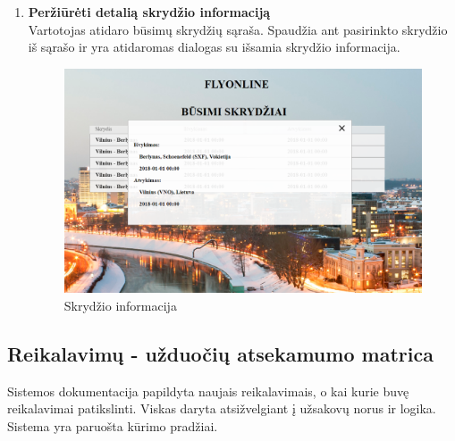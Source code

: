 \documentclass{VUMIFPSkursinis}
\begin{document}
\begin{enumerate}[label=\textbf{U\arabic*}.]
                    \item \textbf{Peržiūrėti detalią skrydžio informaciją}\\
                    Vartotojas atidaro būsimų skrydžių sąraša. Spaudžia ant pasirinkto skrydžio iš sąrašo ir yra atidaromas dialogas su išsamia skrydžio informacija.
                    \begin{figure}[H]	
                        \centering
                        \includegraphics[scale=0.4]{img/details}	
                        \caption{Skrydžio informacija}	
                        \label{Skrydžio informacija}	
                    \end{figure}
                    
                \end{enumerate}
      
            \subsection{Reikalavimų - užduočių atsekamumo matrica}
      
			Sistemos dokumentacija papildyta naujais reikalavimais, o kai kurie buvę reikalavimai patikslinti. Viskas daryta atsižvelgiant į užsakovų norus ir logika. Sistema yra paruošta kūrimo pradžiai.
    
        \appendix  %
      
    
\end{document}
